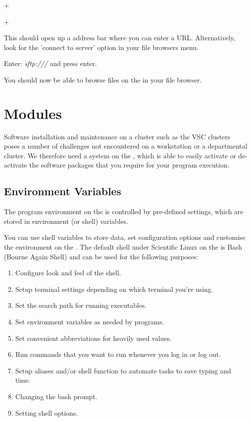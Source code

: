  \iflinux
     + 
  \fi

  \ifmac
     + 
  \fi

  This should open up a address bar where you can enter a URL. Alternatively, look for the 'connect to server' option in your file browsers menu.

  Enter: \emph{sftp://\userid@\loginnode/} and press enter.

  You should now be able to browse files on the \hpc in your file browser.
\fi

\section{Modules}

Software installation and maintenance on a \hpc cluster such as the VSC
clusters poses a number of challenges not encountered on a workstation or a
departmental cluster. We therefore need a system on the \hpc, which is able
to easily activate or de-activate the software packages that you require for
your program execution.

\subsection{Environment Variables}

The program environment on the \hpc is controlled by pre-defined settings,
which are stored in environment (or shell) variables.

You can use shell variables to store data, set configuration options and
customise the environment on the \hpc. The default shell under Scientific
Linux on the \hpc is Bash (Bourne Again Shell) and can be used for the
following purposes:

\begin{enumerate}
\item  Configure look and feel of the shell.
\item  Setup terminal settings depending on which terminal you're using.
\item  Set the search path for running executables.
\item  Set environment variables as needed by programs.
\item  Set convenient abbreviations for heavily used values.
\item  Run commands that you want to run whenever you log in or log out.
\item  Setup aliases and/or shell function to automate tasks to save typing and time.
\item  Changing the bash prompt.
\item  Setting shell options.
\end{enumerate}

